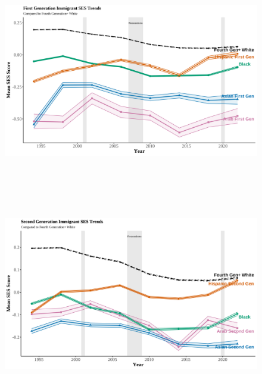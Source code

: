 \begin{center}
    \begin{figure}[H]
    \caption{}
    \includegraphics[width=\textwidth, height=9cm]{figure/04-SES-firstgens.png} 
    \label{fig:diag}
    \caption*{\footnotesize{}}
    \end{figure}
    \hfill%
\end{center}


\clearpage

\begin{center}
    \begin{figure}[H]
    \caption{}
    \includegraphics[width=\textwidth, height=9cm]{figure/05-SES-secondgens.png} 
    \label{fig:diag}
    \caption*{\footnotesize{}}
    \end{figure}
    \hfill%
\end{center}

